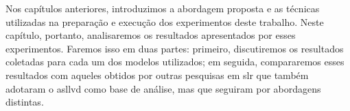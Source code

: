 Nos capítulos anteriores, introduzimos a abordagem proposta e as técnicas utilizadas na preparação e execução dos experimentos deste trabalho.
Neste capítulo, portanto, analisaremos os resultados apresentados por esses experimentos.
Faremos isso em duas partes: 
primeiro, discutiremos os resultados coletadas para cada um dos modelos utilizados; em seguida, compararemos esses resultados com aqueles obtidos por outras pesquisas em \acrfull{slr} que também adotaram o \acrfull{asllvd} como base de análise, mas que seguiram por abordagens distintas.
